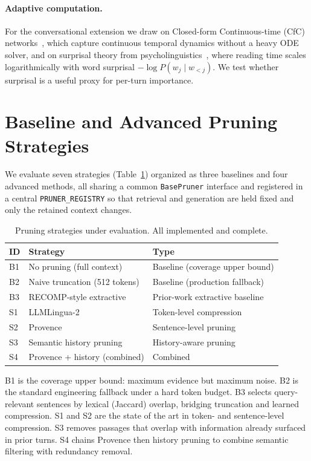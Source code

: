 \documentclass[runningheads]{llncs}
\begin{document}
\paragraph{Adaptive computation.}
For the conversational extension we draw on Closed-form Continuous-time (CfC)
networks~\cite{hasani2022cfc}, which capture continuous temporal dynamics
without a heavy ODE solver, and on surprisal theory from
psycholinguistics~\cite{levy2008,smith2013}, where reading time scales
logarithmically with word surprisal $-\log P(w_j\mid w_{<j})$. We test whether
surprisal is a useful proxy for per-turn importance.

\section{Baseline and Advanced Pruning Strategies}

We evaluate seven strategies (Table~\ref{tab:strategies}) organized as three
baselines and four advanced methods, all sharing a common \texttt{BasePruner}
interface and registered in a central \texttt{PRUNER\_REGISTRY} so that
retrieval and generation are held fixed and only the retained context changes.

\begin{table}[t]
\centering
\caption{Pruning strategies under evaluation. All implemented and complete.}\label{tab:strategies}
\begin{tabular}{lll}
\toprule
\textbf{ID} & \textbf{Strategy} & \textbf{Type}\\
\midrule
B1 & No pruning (full context)        & Baseline (coverage upper bound)\\
B2 & Naive truncation (512 tokens)    & Baseline (production fallback)\\
B3 & RECOMP-style extractive          & Prior-work extractive baseline\\
S1 & LLMLingua-2                      & Token-level compression\\
S2 & Provence                        & Sentence-level pruning\\
S3 & Semantic history pruning         & History-aware pruning\\
S4 & Provence + history (combined)    & Combined\\
\bottomrule
\end{tabular}
\end{table}

B1 is the coverage upper bound: maximum evidence but maximum noise. B2 is the
standard engineering fallback under a hard token budget. B3 selects
query-relevant sentences by lexical (Jaccard) overlap, bridging truncation and
learned compression. S1 and S2 are the state of the art in token- and
sentence-level compression. S3 removes passages that overlap with information
already surfaced in prior turns. S4 chains Provence then history pruning to
combine semantic filtering with redundancy removal.
\end{document}

